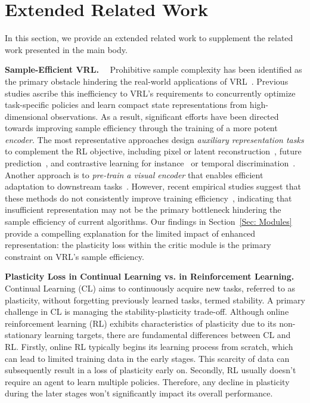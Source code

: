 \section{Extended Related Work}
\label{Appendix: Extended Related Work}
In this section, we provide an extended related work to supplement the related work presented in the main body.

\textbf{Sample-Efficient VRL.}~~
Prohibitive sample complexity has been identified as the primary obstacle hindering the real-world applications of VRL~\citep{SAC-AE}.
Previous studies ascribe this inefficiency to VRL's requirements to concurrently optimize task-specific policies and learn compact state representations from high-dimensional observations.
As a result, significant efforts have been directed towards improving sample efficiency through the training of a more potent \textit{encoder}.
The most representative approaches design \textit{auxiliary representation tasks} to complement the RL objective, including pixel or latent reconstruction~\citep{SAC-AE, MLR}, future prediction~\citep{PI-SAC, SPR, Playvirtual}, and contrastive learning for instance~\citep{CURL, CCLF, DRIBO} or temporal discrimination~\citep{M-CURL, CPC, CCFDM, DRIML}.
Another approach is to \textit{pre-train a visual encoder} that enables efficient adaptation to downstream tasks~\citep{RRL,MVP,PVR,R3M}.
However, recent empirical studies suggest that these methods do not consistently improve training efficiency~\citep{Does_SSL, Learning-from-Scratch, ma2023learning}, indicating that insufficient representation may not be the primary bottleneck hindering the sample efficiency of current algorithms.
Our findings in Section~\ref{Sec: Modules} provide a compelling explanation for the limited impact of enhanced representation: the plasticity loss within the critic module is the primary constraint on VRL's sample efficiency.

\textbf{Plasticity Loss in Continual Learning vs. in Reinforcement Learning.}~~
Continual Learning (CL) aims to continuously acquire new tasks, referred to as plasticity, without forgetting previously learned tasks, termed stability. A primary challenge in CL is managing the stability-plasticity trade-off. Although online reinforcement learning (RL) exhibits characteristics of plasticity due to its non-stationary learning targets, there are fundamental differences between CL and RL. 
Firstly, online RL typically begins its learning process from scratch, which can lead to limited training data in the early stages. This scarcity of data can subsequently result in a loss of plasticity early on. Secondly, RL usually doesn't require an agent to learn multiple policies. Therefore, any decline in plasticity during the later stages won't significantly impact its overall performance.


